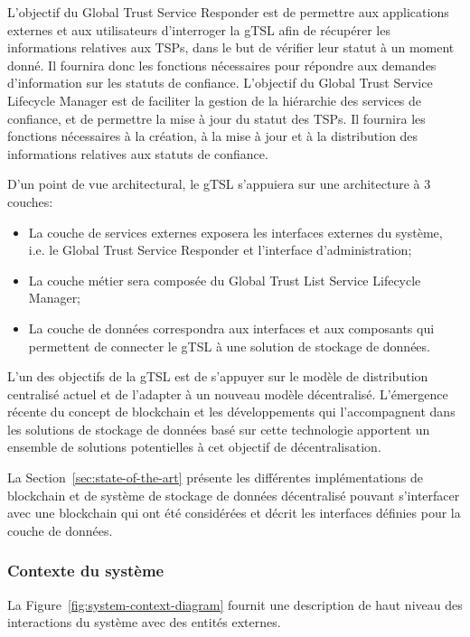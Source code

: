 \documentclass{tnreport}
\begin{document}

L'objectif du Global Trust Service Responder est de permettre aux applications externes et aux utilisateurs d'interroger la gTSL afin de récupérer les informations relatives aux TSPs, dans le but de vérifier leur statut à un moment donné. 
Il fournira donc les fonctions nécessaires pour répondre aux demandes d'information sur les statuts de confiance.
L'objectif du Global Trust Service Lifecycle Manager est de faciliter la gestion de la hiérarchie des services de confiance, et de permettre la mise à jour du statut des TSPs.
Il fournira les fonctions nécessaires à la création, à la mise à jour et à la distribution des informations relatives aux statuts de confiance.

D'un point de vue architectural, le gTSL s'appuiera sur une architecture à 3 couches:
\begin{itemize}
	\item La couche de services externes exposera les interfaces externes du système, i.e. le Global Trust Service Responder et l'interface d'administration;
	\item La couche métier sera composée du Global Trust List Service Lifecycle Manager;
	\item La couche de données correspondra aux interfaces et aux composants qui permettent de connecter le gTSL à une solution de stockage de données.
	\newline
\end{itemize}
L'un des objectifs de la gTSL est de s'appuyer sur le modèle de distribution centralisé actuel et de l'adapter à un nouveau modèle décentralisé.
L'émergence récente du concept de blockchain et les développements qui l'accompagnent dans les solutions de stockage de données basé sur cette technologie apportent un ensemble de solutions potentielles à cet objectif de décentralisation.

La Section~\ref{sec:state-of-the-art} présente les différentes implémentations de blockchain et de système de stockage de données décentralisé pouvant s'interfacer avec une blockchain qui ont été considérées et décrit les interfaces définies pour la couche de données.

\subsubsection{Contexte du système}

La Figure~\ref{fig:system-context-diagram} fournit une description de haut niveau des interactions du système avec des entités externes.
\end{document}
